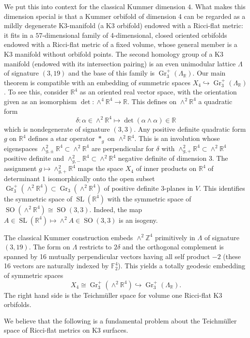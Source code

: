 \documentclass[11pt,letterpaper]{amsart}
\theoremstyle{definition}
\numberwithin{equation}{section}
\theoremstyle{definition}
\newcommand{\Fb}{\mathbb{F}}
\newcommand{\Rb}{\mathbb{R}}
\newcommand{\Zb}{\mathbb{Z}}
\DeclareMathOperator{\Gras}{Gr}
\DeclareMathOperator{\SL}{SL}
\DeclareMathOperator{\SO}{SO}
\begin{document}
We put this into context for  the classical Kummer dimension $4$. What makes this dimension  special is that a Kummer orbifold of dimension 4 can be regarded as a mildly degenerate K3-manifold (a K3 orbifold) endowed with a Ricci-flat metric: it fits in a $57$-dimensional family of 4-dimensional, closed oriented orbifolds endowed with a Ricci-flat metric of a fixed volume, whose general member is a K3 manifold  without orbifold points. The second homology group of a K3 manifold (endowed with its intersection pairing)  is an even unimodular lattice  $\Lambda$   of signature $(3,19)$  and the base of this family is 
$\Gras_3^+(\Lambda_\Rb)$.  Our  main theorem is compatible with an embedding of summetric spaces $X_4\hookrightarrow \Gras_3^+(\Lambda_\Rb)$.
To see this, consider  $\Rb^4$ as an oriented real vector  space, with the orientation given as an isomorphism $\det: \wedge^4\Rb^4\to \Rb$. This defines on 
$\wedge^2\Rb^4$  a quadratic form 
\[
\delta: \alpha\in\wedge^2\Rb^4\mapsto \det(\alpha\wedge\alpha)\in \Rb
\]  
which  is nondegenerate of signature $(3,3)$. 
Any positive definite quadratic form $g$   on $\Rb^4$ defines a star operator $*_g$ on $\wedge^2\Rb^4$.
This is an involution whose eigenspaces $\wedge_{g,\pm}^2\Rb^4\subset \wedge^2\Rb^4$ are perpendicular for $\delta$ with 
$\wedge_{g,+}^2\Rb^4\subset \wedge^2\Rb^4$ positive definite  and $\wedge_{g,-}^2\Rb^4\subset \wedge^2\Rb^4$ negative definite of dimension $3$.
The assignment $g\mapsto \wedge_{g,+}^2\Rb^4$ maps the space $X_4$ of inner products on $\Rb^4$ of determinant $1$ isomorphically onto 
the open subset  $\Gras_3^+(\wedge^2\Rb^4)\subset \Gras_3(\wedge^2\Rb^4)$ of positive definite $3$-planes in $V$. This identifies the symmetric space of $\SL(\Rb^4)$ with the 
symmetric space of $\SO (\wedge^2\Rb^4)\cong \SO(3,3)$. Indeed, the map $A\in \SL(\Rb^4)\mapsto \wedge^2A\in \SO (3,3)$ is an isogeny.

The classical Kummer construction embeds $\wedge^2\Zb^4$ primitively in $\Lambda$ of signature $(3,19)$. The form on $\Lambda$  restricts to $2\delta$ and  the orthogonal complement is spanned by 16 mutually perpendicular vectors having all self product $-2$ 
(these 16  vectors are naturally indexed by $\Fb_2^4$). This yields a totally geodesic  embedding of symmetric spaces 
\[
X_4\cong \Gras^+_3(\wedge^2\Rb^4)\hookrightarrow \Gras^+_3(\Lambda_\Rb).
\]
The right hand side is the Teichm\"uller space for volume one Ricci-flat K3 orbifolds.

We believe that the following is a fundamental problem about the Teichm\"uller space of Ricci-flat metrics on K3 surfaces. 
\end{document}
